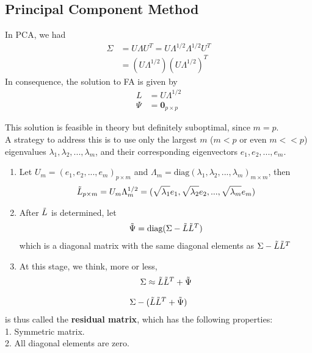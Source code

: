 \documentclass[12pt]{extarticle}
\newcommand{\<}{\langle}
\renewcommand{\>}{\rangle}
\theoremstyle{definition}
\begin{document}
\subsection{Principal Component Method}
\begin{tcolorbox}[enhanced, drop fuzzy shadow, title=Principal Component Method]
In PCA, we had
\begin{align*}
    \Sigma &= U\Lambda U^T = U\Lambda^{1/2}\Lambda^{1/2}U^T\\
    &= (U\Lambda^{1/2})(U\Lambda^{1/2})^T
\end{align*}
In consequence, the solution to FA is given by
\begin{align*}
    L &= U\Lambda^{1/2}\\
    \Psi &= \textbf{0}_{p\times p}
\end{align*}
\end{tcolorbox}
This solution is feasible in theory but definitely suboptimal, since $m=p$.\\
A strategy to address this is to use only the largest $m$ ($m<p$ or even $m<<p$) eigenvalues $\lambda_1,\lambda_2,...,\lambda_m$, and their corresponding eigenvectors $e_1,e_2,...,e_m$.
\begin{enumerate}
    \item Let $U_m=(e_1,e_2,...,e_m)_{p\times m}$ and $\Lambda_m=\text{diag}(\lambda_1,\lambda_2,...,\lambda_m)_{m\times m}$, then
    \begin{align*}
        \Tilde{L}_{p\times m} = U_m \Lambda_m^{1/2} = (\sqrt{\lambda_1}e_1,\sqrt{\lambda_2}e_2,...,\sqrt{\lambda_m}e_m)
    \end{align*}
    \item After $\Tilde{L}$ is determined, let
    \begin{align*}
        \Tilde{\Psi}= \text{diag}(\Sigma-\Tilde{L}\Tilde{L}^T)
    \end{align*}
    which is a diagonal matrix with the same diagonal elements as $\Sigma-\Tilde{L}\Tilde{L}^T$
    \item At this stage, we think, more or less,
    \begin{align*}
        \Sigma \approx \Tilde{L}\Tilde{L}^T + \Tilde{\Psi}
    \end{align*}
\end{enumerate}

\begin{tcolorbox}[enhanced, drop fuzzy shadow, title=Principal Component Method; Residual Matrix]
\begin{align*}
    \Sigma - (\Tilde{L}\Tilde{L}^T + \Tilde{\Psi})
\end{align*}
is thus called the \textbf{residual matrix}, which has the following properties:\\
1. Symmetric matrix.\\
2. All diagonal elements are zero.
\end{tcolorbox}
\end{document}
